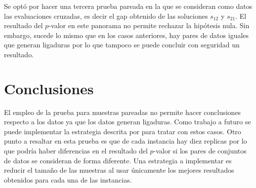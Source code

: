 \documentclass[preprint,12pt,authoryear]{elsarticle}
\begin{document}

Se optó por hacer una tercera prueba pareada en la que se consideran como datos las evaluaciones cruzadas, es decir el gap obtenido de las soluciones $s_{12}$ y $s_{21}$. El resultado del $p$-valor en este panorama no permite rechazar la hipótesis nula. Sin embargo, sucede lo mismo que en los casos anteriores, hay pares de datos iguales que generan ligaduras por lo que tampoco se puede concluir con seguridad un resultado. %




\section{Conclusiones}
\label{conclusiones}

El empleo de la prueba para muestras pareadas no permite hacer conclusiones respecto a los datos ya que los datos generan ligaduras. Como trabajo a futuro se puede implementar la estrategia descrita por \cite{degroot2012} para tratar con estos casos. Otro punto a resaltar en esta prueba es que de cada instancia hay diez replicas por lo que podría haber diferencias en el resultado del $p$-valor si los pares de conjuntos de datos se consideran de forma diferente. Una estrategia a implementar es reducir el tamaño de las muestras al usar únicamente los mejores resultados obtenidos para cada una de las instancias.




  
  


%
%

\end{document}
